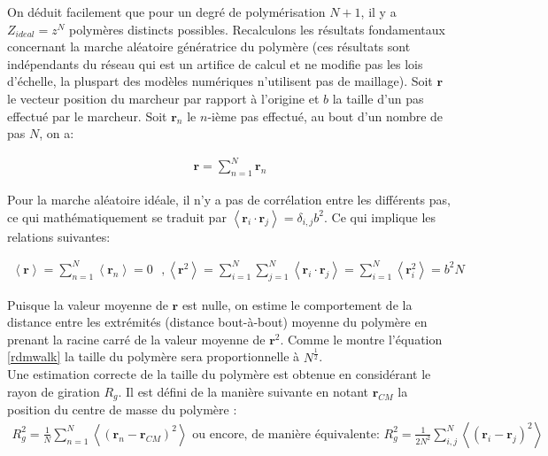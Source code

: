 On déduit facilement que pour un degré de polymérisation $N+1$, il y a $Z_{ideal}=z^N$ polymères distincts possibles. Recalculons les résultats fondamentaux concernant la marche aléatoire génératrice du polymère (ces résultats sont indépendants du réseau qui est un artifice de calcul et ne modifie pas les lois d'échelle, la pluspart des modèles numériques n'utilisent pas de maillage). Soit $\textbf{r}$ le vecteur position du marcheur par rapport à l'origine et $b$ la taille d'un pas effectué par le marcheur. Soit $\textbf{r}_n$ le $n$-ième pas effectué, au bout d'un nombre de pas $N$, on a: 

\begin{eqnarray}
\textbf{r} = \sum_{n = 1}^{N} \textbf{r}_n
\end{eqnarray}

Pour la marche aléatoire idéale, il n'y a pas de corrélation entre les différents pas, ce qui mathématiquement se traduit par $\left<\textbf{r}_i \cdot \textbf{r}_j\right> = \delta_{i,j} b^2$. Ce qui implique les relations suivantes:

\begin{eqnarray}
\left<\textbf{r}\right>\text{} = \sum_{n = 1}^{N} \left<\textbf{r}_n \right>\text{} =\text{} 0 \text{ }, \text{} \left<\textbf{r}^2\right> \text{}= \sum_{i = 1}^{N} \sum_{j = 1}^{N} \left<\textbf{r}_i \cdot \textbf{r}_j\right> \text{}= \sum_{i = 1}^{N} \left<\textbf{r}_i^2\right> \text{}= b^2 N
\label{rdmwalk}
\end{eqnarray}

 Puisque la valeur moyenne de $\textbf{r}$ est nulle, on estime le comportement de la distance entre les extrémités (distance bout-à-bout) moyenne du polymère en prenant la racine carré de la valeur moyenne de $\textbf{r}^2$. Comme le montre l'équation \ref{rdmwalk} la taille du polymère sera proportionnelle à $N^\frac{1}{2}$.\\
 
 Une estimation correcte de la taille du polymère est obtenue en considérant le rayon de giration $R_g$. Il est défini de la manière suivante en notant $\textbf{r}_{CM}$ la position du centre de masse du polymère :
 \begin{eqnarray}
R_g^2\text{}=\text{}\frac{1}{N}\sum_{n = 1}^{N} \left<(\textbf{r}_n-\textbf{r}_{CM})^2\right>
 \text{ ou encore, de manière équivalente: }
R_g^2\text{}=\text{}\frac{1}{2N^2}\sum_{i,j}^N \left<(\textbf{r}_i-\textbf{r}_{j})^2\right>
\label{equ}
\end{eqnarray}
 
